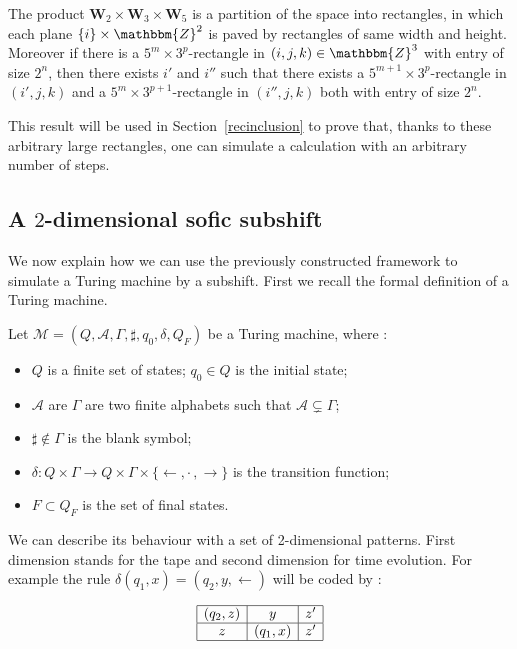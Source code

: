 \documentclass[proceedings]{stacs}
\theoremstyle{plain}\newtheorem{satz}[thm]{Satz}
\theoremstyle{definition}\newtheorem{crucial}[thm]{Crucial Definition}
\newcommand{\Z}{\mathbbm{Z}}
\newcommand{\A}{\mathcal{A}}
\newcommand{\W}{\mathbf{W}}
\begin{document}
\begin{proposition}\label{frameworkTM}
The product $\W_2\times \W_3\times \W_5$ is a partition of the space into rectangles, in which each plane $\{ i\}\times\mathbbm{Z}^2$ is paved by rectangles of same width and height. Moreover if there is a $5^m\times 3^p$-rectangle in $(i,j,k)\in\Z^3$ with entry of size $2^n$, then there exists $i'$ and $i''$ such that there exists a $5^{m+1}\times 3^p$-rectangle in $(i',j,k)$ and a $5^m\times 3^{p+1}$-rectangle in $(i'',j,k)$ both with entry of size $2^n$. 
\end{proposition}

This result will be used in Section~\ref{recinclusion} to prove that, thanks to these arbitrary large rectangles, one can simulate a calculation with an arbitrary number of steps.

	\subsection{A $2$-dimensional sofic subshift}

We now explain how we can use the previously constructed framework to simulate a Turing machine by a subshift. First we recall the formal definition of a Turing machine.

\begin{definition}
Let $\mathcal{M}=(Q,\A,\Gamma,\sharp,q_0,\delta,Q_F)$ be a Turing machine, where :
\begin{itemize}
\item $Q$ is a finite set of states; $q_0\in Q$ is the initial state;
\item $\A$ are $\Gamma$ are two finite alphabets such that $\A\subsetneq\Gamma$;
\item $\sharp\notin\Gamma$ is the blank symbol;
\item $\delta : Q\times\Gamma\to Q\times\Gamma\times\{\leftarrow,\cdot\, ,\rightarrow\}$ is the transition function;
\item $F\subset Q_F$ is the set of final states.
\end{itemize}
\end{definition}

We can describe its behaviour with a set of 2-dimensional patterns. First dimension stands for the tape and second dimension for time evolution. For example the rule $\delta(q_1,x)=(q_2,y,\leftarrow)$ will be coded by :

$$
\begin{array}{|c|c|c|}
\hline
 (q_2,z) & y & z'\\
\hline
 z & (q_1,x) & z'\\
\hline
\end{array}
$$
\end{document}
